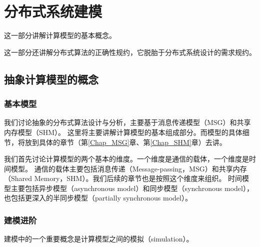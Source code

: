 \documentclass[UTF8]{ctexrep}
\begin{document}
\part{分布式系统建模}

这一部分讲解计算模型的基本概念。

这一部分还讲解分布式算法的正确性规约，它脱胎于分布式系统设计的需求规约。

\chapter{抽象计算模型的概念}

\section{基本模型}

我们讨论抽象的分布式算法设计与分析，主要基于消息传递模型（MSG）和共享内存模型（SHM）。
这里将主要讲解计算模型的基本组成部分。而模型的具体细节，将放到具体的章节（第\ref{Chap_MSG}章、第\ref{Chap_SHM}章）去讲。

我们首先讨论计算模型的两个基本的维度。一个维度是通信的载体，一个维度是时间模型。
通信的载体主要包括消息传递（Message-passing，MSG）和共享内存（Shared Memory，SHM）。我们后续的章节也是按照这个维度来组织。
时间模型主要包括异步模型（asynchronous model）和同步模型（synchronous model），也包括更深入的半同步模型（partially synchronous model）。



\section{建模进阶}

建模中的一个重要概念是计算模型之间的模拟（simulation）。

\end{document}
